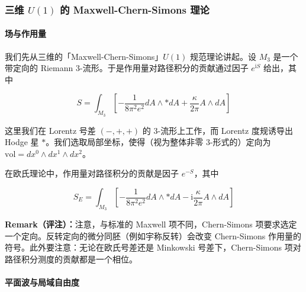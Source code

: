 
\subsubsection{三维 $U(1)$ 的 Maxwell-Chern-Simons 理论} %

\paragraph{场与作用量} %

我们先从三维的「Maxwell-Chern-Simons」$U(1)$ 规范理论讲起。设 $M_3$ 是一个带定向的 Riemann 3-流形。于是作用量对路径积分的贡献通过因子 $e^{\mathrm{i}S}$ 给出，其中

\begin{equation}
  S=\int_{M_3}\left[-\frac{1}{8\pi^{2}e^{2}}dA\wedge\ast dA+\frac{\kappa}{2\pi}A\wedge dA\right]
  \tag{2.51}
  \label{eq:2.51}
\end{equation}

这里我们在 Lorentz 号差 $(-,+,+)$ 的 3-流形上工作，而 Lorentz 度规诱导出 Hodge 星 $\ast$。我们选取局部坐标，使得（视为整体非零 3-形式的）定向为 $\mathrm{vol}=dx^{0}\wedge dx^{1}\wedge dx^{2}$。

在欧氏理论中，作用量对路径积分的贡献是因子 $e^{-S}$，其中

\begin{equation}
  S_E=\int_{M_3}\left[-\frac{1}{8\pi^{2}e^{2}}dA\wedge\ast dA-\mathrm{i}\frac{\kappa}{2\pi}A\wedge dA\right]
  \tag{2.52}
  \label{eq:2.52}
\end{equation}

\textbf{Remark（评注）：}注意，与标准的 Maxwell 项不同，Chern-Simons 项要求选定一个定向。反转定向的微分同胚（例如宇称反转）会改变 Chern-Simons 作用量的符号。此外要注意：无论在欧氏号差还是 Minkowski 号差下，Chern-Simons 项对路径积分测度的贡献都是一个相位。

\paragraph{平面波与局域自由度} %

